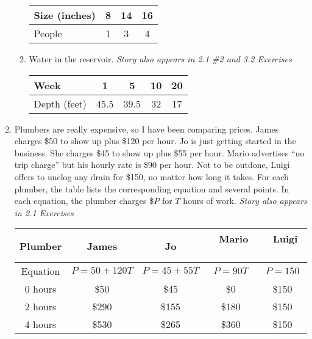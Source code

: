 \begin{enumerate}
\begin{enumerate}
\bigskip
\begin{tabular} {|l|| c  |c |c|}\hline
Size (inches) & 8  & 14 & 16 \\ \hline
People & 1 & 3 & 4 \\ \hline
\end{tabular} 
\vfill

\item Water in the reservoir. \hfill \emph{Story also appears in 2.1 \#2 and 3.2 Exercises}

\bigskip
\begin{tabular} {|l|| c  |c  |c |c|}\hline
Week & 1 & 5 & 10 & 20 \\ \hline
Depth (feet) & 45.5 & 39.5 & 32 & 17 \\ \hline
\end{tabular}
\vfill


\end{enumerate}

\newpage %

\item Plumbers are really expensive, so I have been comparing prices.  James charges \$50 to show up plus \$120 per hour. Jo is just getting started in the business.  She charges \$45 to show up plus \$55 per hour.  Mario advertises ``no trip charge'' but his hourly rate is \$90 per hour. Not to be outdone, Luigi offers to unclog any drain for \$150, no matter how long it takes.  For each plumber, the table lists the corresponding equation and several points.   In each equation,  the plumber charges \$$P$ for $T$ hours of work.   \hfill \emph{Story also appears in 2.1 Exercises}
\begin{center}
\begin{tabular} {|c|| c|| c|| c|| c| } \hline
Plumber & James & Jo &~\quad Mario \quad ~& ~\quad Luigi \quad ~\\  \hline
Equation & $P=50+120T$ & $P=45+55T$ & $P=90T$ & $P=150$ \\ \hline \hline
0 hours & \$50 & \$45 & \$0 & \$150 \\ \hline
2 hours &  \$290 & \$155 & \$180 & \$150 \\ \hline
4 hours & \$530 & \$265 & \$360 & \$150  \\ \hline
\end{tabular}
\end{center}  


\end{enumerate}
